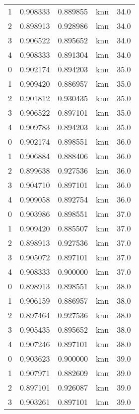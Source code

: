 \begin{tabular}{rrrlr}
     1 & 0.908333 & 0.889855 &      knn &       34.0 \\
     2 & 0.898913 & 0.928986 &      knn &       34.0 \\
     3 & 0.906522 & 0.895652 &      knn &       34.0 \\
     4 & 0.908333 & 0.891304 &      knn &       34.0 \\
     0 & 0.902174 & 0.894203 &      knn &       35.0 \\
     1 & 0.909420 & 0.886957 &      knn &       35.0 \\
     2 & 0.901812 & 0.930435 &      knn &       35.0 \\
     3 & 0.906522 & 0.897101 &      knn &       35.0 \\
     4 & 0.909783 & 0.894203 &      knn &       35.0 \\
     0 & 0.902174 & 0.898551 &      knn &       36.0 \\
     1 & 0.906884 & 0.888406 &      knn &       36.0 \\
     2 & 0.899638 & 0.927536 &      knn &       36.0 \\
     3 & 0.904710 & 0.897101 &      knn &       36.0 \\
     4 & 0.909058 & 0.892754 &      knn &       36.0 \\
     0 & 0.903986 & 0.898551 &      knn &       37.0 \\
     1 & 0.909420 & 0.885507 &      knn &       37.0 \\
     2 & 0.898913 & 0.927536 &      knn &       37.0 \\
     3 & 0.905072 & 0.897101 &      knn &       37.0 \\
     4 & 0.908333 & 0.900000 &      knn &       37.0 \\
     0 & 0.898913 & 0.898551 &      knn &       38.0 \\
     1 & 0.906159 & 0.886957 &      knn &       38.0 \\
     2 & 0.897464 & 0.927536 &      knn &       38.0 \\
     3 & 0.905435 & 0.895652 &      knn &       38.0 \\
     4 & 0.907246 & 0.897101 &      knn &       38.0 \\
     0 & 0.903623 & 0.900000 &      knn &       39.0 \\
     1 & 0.907971 & 0.882609 &      knn &       39.0 \\
     2 & 0.897101 & 0.926087 &      knn &       39.0 \\
     3 & 0.903261 & 0.897101 &      knn &       39.0 \\

\end{tabular}
